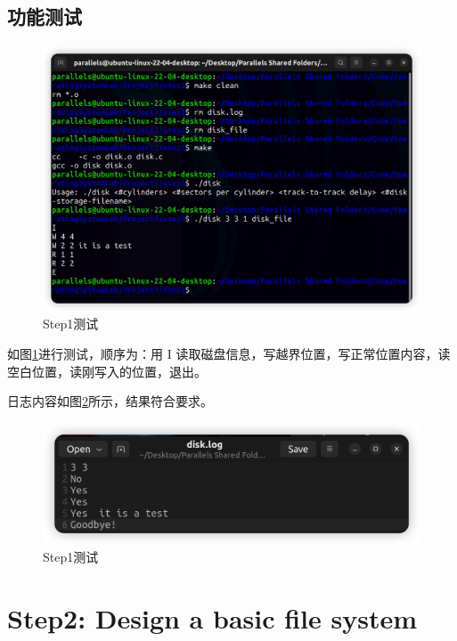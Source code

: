 \documentclass{article}
\begin{document}
\subsection{功能测试}

\begin{figure}[H]
\center
\includegraphics[scale = 0.45]{s1-t1.png}
\caption{Step1测试}
\label{s1-t1}
\end{figure}

如图\ref{s1-t1}进行测试，顺序为：用 I 读取磁盘信息，写越界位置，写正常位置内容，读空白位置，读刚写入的位置，退出。

日志内容如图\ref{s1-t2}所示，结果符合要求。

\begin{figure}[H]
\center
\includegraphics[scale = 0.65]{s1-t2.png}
\caption{Step1测试}
\label{s1-t2}
\end{figure}


\section{Step2: Design a basic file system}
\end{document}
